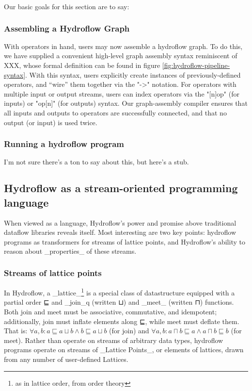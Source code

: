 Our basic goals for this section are to say:

\subsubsection{Assembling a Hydroflow Graph}

With operators in hand, users may now assemble a hydroflow graph.  To
do this, we have supplied a convenient high-level graph assembly
syntax reminiscent of XXX, whose formal definition can be found in
figure \ref{fig:hydroflow-pipeline-syntax}. With this syntax, users
explicitly create instances of previously-defined operators, and
``wire'' them together via the "->" notation.  For operators with
multiple input or output streams, users can index operators via the
"[n]op" (for inputs) or "op[n]" (for outputs) syntax.  Our
graph-assembly compiler ensures that all inputs and outputs to
operators are successfully connected, and that no output (or input) is
used twice.

\subsubsection{Running a hydroflow program}

I'm not sure there's a ton to say about this, but here's a stub.

\subsection{Hydroflow as a stream-oriented programming language}

When viewed as a language, Hydroflow's power and promise above
traditional dataflow libraries reveals itself. Most interesting are
two key points: hydroflow programs as transformers for streams of
lattice points, and Hydroflow's ability to reason about _properties_
of these streams.

\subsubsection{Streams of lattice points}

In Hydroflow, a _lattice_\footnote{as in lattice order, from order
theory} is a special class of datastructure equipped with a partial
order ⊑ and _join_q (written ⊔) and _meet_ (written ⊓) functions.
Both join and meet must be associative, commutative, and idempotent;
additionally, join must inflate elements along ⊑, while meet must
deflate them. That is: $∀ a,b: a ⊑ a ⊔ b ∧ b ⊑ a ⊔ b$ (for join) and
$∀ a,b: a ⊓ b ⊑ a ∧ a ⊓ b ⊑ b$ (for meet).  Rather than operate on
streams of arbitrary data types, hydroflow programs operate on streams
of _Lattice Points_, or elements of lattices, drawn from any number of
user-defined Lattices.

